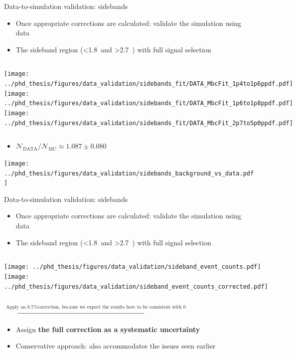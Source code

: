 \documentclass[xcolor=dvipsnames]{beamer}
\begin{document}
\begin{frame}{Data-to-simulation validation: sidebands}
   \scriptsize\centering
   \begin{itemize}
      \item Once appropriate corrections are calculated: validate the simulation using data
      \item The sideband region (\EB<1.8~\gev and \EB>2.7~\gev) with full signal selection
   \end{itemize}

   \begin{columns}
      \centering
      \texttt{[image: ../phd\_thesis/figures/data\_validation/sidebands\_fit/DATA\_MbcFit\_1p4to1p6ppdf.pdf]}
      \centering
      \texttt{[image: ../phd\_thesis/figures/data\_validation/sidebands\_fit/DATA\_MbcFit\_1p6to1p8ppdf.pdf]}
      \centering
      \texttt{[image: ../phd\_thesis/figures/data\_validation/sidebands\_fit/DATA\_MbcFit\_2p7to5p0ppdf.pdf]}
   \end{columns}

   \begin{itemize}
      \item $\mathcal{N}_{\mathrm{DATA}}/\mathcal{N}_{\mathrm{MC}}\approx 1.087\pm 0.080$
   \end{itemize}

   \texttt{[image: ../phd\_thesis/figures/data\_validation/sidebands\_background\_vs\_data.pdf]}

\end{frame}
\begin{frame}{Data-to-simulation validation: sidebands}
   \scriptsize\centering
   \begin{itemize}
      \item Once appropriate corrections are calculated: validate the simulation using data
      \item The sideband region (\EB<1.8~\gev and \EB>2.7~\gev) with full signal selection
   \end{itemize}

   \begin{columns}
      \centering
      \texttt{[image: ../phd\_thesis/figures/data\_validation/sideband\_event\_counts.pdf]}
    \centering
     \texttt{[image: ../phd\_thesis/figures/data\_validation/sideband\_event\_counts\_corrected.pdf]}
   \end{columns}

   $\xrightarrow{\text{Apply an 8.7\% correction, because we expect the results here to be consistent with 0}}$

   \begin{itemize}
      \item Assign \textbf{the full correction as a systematic uncertainty}
      \item[\ra] Conservative approach: also accommodates the issues seen earlier
   \end{itemize}

\end{frame}
\end{document}

